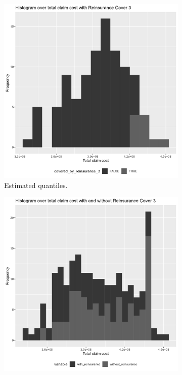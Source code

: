 \documentclass[11pt]{article}
\begin{document}
 \begin{figure}[!h]
\centering
    \begin{subfigure}{.32\textwidth}
      \centering
      \includegraphics[width=.9\linewidth]{plots/reinsurance3/histogram_total_claim_cost_reinsurance3.png}
      \caption{Estimated quantiles.}
    \end{subfigure}
    \begin{subfigure}{.32\textwidth}
      \centering
      \includegraphics[width=.9\linewidth]{plots/reinsurance3/histogram_total_claim_cost_with_reinsurance.png}

\end{subfigure}
\end{figure}
\end{document}
